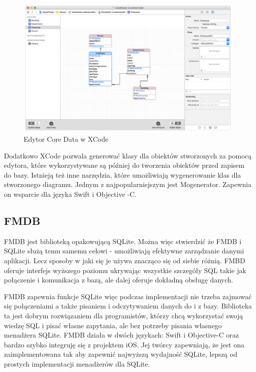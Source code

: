 \begin{figure}[h]
	\includegraphics[width=\linewidth]{img/Entity_Inheritence_2_2x.png}
	\caption{Edytor Core Data w XCode}
	\label{fig: CoreDataEdytor}
\end{figure}

Dodatkowo XCode pozwala generować klasy dla obiektów stworzonych za pomocą edytora, które wykorzystywane są później do tworzenia obiektów przed zapisem do bazy. Istnieją też inne narzędzia, które umożliwiają wygenerowanie klas dla stworzonego diagramu. Jednym z najpopularniejszym jest Mogenerator. Zapewnia on wsparcie dla języka Swift i Objective -C.

\newpage
\subsection{FMDB}

FMDB jest biblioteką opakowującą SQLite. Można więc stwierdzić że FMDB i SQLite służą temu samemu celowi - umożliwiają efektywne zarządzanie danymi aplikacji. Lecz sposoby w jaki się je używa znacząco się od siebie różnią. FMBD oferuje interfejs wyższego poziomu ukrywając wszystkie szczegóły SQL takie jak połączenie i komunikacja z bazą, ale  dalej oferuje dokładną obsługę danych. \par 
FMDB zapewnia funkcje SQLite więc podczas implementacji nie trzeba zajmować się połączeniami a także pisaniem i odczytywaniem danych do i z bazy. Biblioteka ta jest dobrym rozwiązaniem dla programistów, którzy chcą wykorzystać swoją wiedzę SQL i pisać własne zapytania, ale bez potrzeby pisania własnego menadżera SQLite. FMDB działa w dwóch językach: Swift i Objective-C oraz bardzo szybko integruję się z projektem iOS. Jej twórcy zapewniają, że jest ona zaimplementowana tak aby zapewnić najwyższą wydajność SQLite, lepszą od prostych implementacji menadżerów dla SQLite. \par

